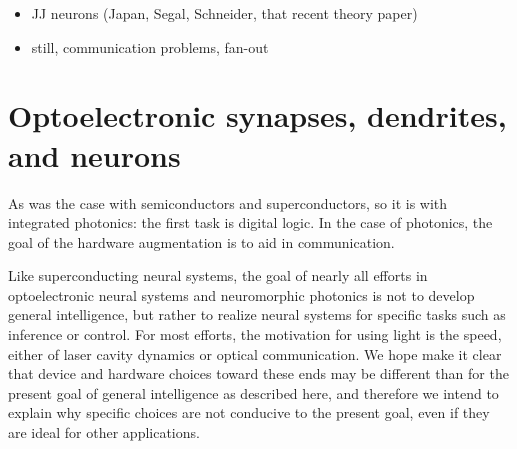 \documentclass[twocolumn]{article}
\begin{document}
\begin{itemize}
\item JJ neurons (Japan, Segal, Schneider, that recent theory paper)
\item still, communication problems, fan-out
\end{itemize}

\section{\label{sec:optoelectronicNeurons}Optoelectronic synapses, dendrites, and neurons}

As was the case with semiconductors and superconductors, so it is with integrated photonics: the first task is digital logic. In the case of photonics, the goal of the hardware augmentation is to aid in communication.

Like superconducting neural systems, the goal of nearly all efforts in optoelectronic neural systems and neuromorphic photonics is not to develop general intelligence, but rather to realize neural systems for specific tasks such as inference or control. For most efforts, the motivation for using light is the speed, either of laser cavity dynamics or optical communication. We hope make it clear that device and hardware choices toward these ends may be different than for the present goal of general intelligence as described here, and therefore we intend to explain why specific choices are not conducive to the present goal, even if they are ideal for other applications.
\end{document}
